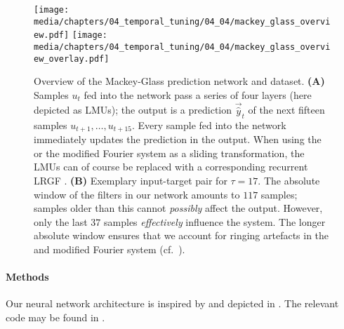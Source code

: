 \begin{figure}
	\texttt{[image: media/chapters/04\_temporal\_tuning/04\_04/mackey\_glass\_overview.pdf]}%
	\kern-158mm\texttt{[image: media/chapters/04\_temporal\_tuning/04\_04/mackey\_glass\_overview\_overlay.pdf]}\\[0.25cm]
	{\label{fig:mackey_glass_overview_overlay_a}}%
	{\label{fig:mackey_glass_overview_overlay_b}}%
	\caption[Overview of the Mackey-Glass prediction network and dataset]{
		Overview of the Mackey-Glass prediction network and dataset.
		\textbf{(A)} Samples $u_t$ fed into the network pass a series of four \LMU layers (here depicted as \FIR LMUs); the output is a prediction $\vec{\hat y}_t$ of the next fifteen samples $u_{t + 1}, \ldots, u_{t + 15}$.
		Every sample fed into the network immediately updates the prediction in the output.
		When using the \LDN or the modified Fourier system as a sliding transformation, the \FIR LMUs can of course be replaced with a corresponding recurrent LRGF \LMU.
		\textbf{(B)} Exemplary input-target pair for $\tau = 17$.
		The absolute window of the \FIR filters in our network amounts to $117$ samples; samples older than this cannot \emph{possibly} affect the output. However, only the last $37$ samples \emph{effectively} influence the system.
		The longer absolute window ensures that we account for ringing artefacts in the \LDN and modified Fourier system (cf.~).
	}
\end{figure}

\paragraph{Methods}
Our neural network architecture is inspired by \citet{voelker2019lmu} and depicted in .
The relevant code may be found in .


